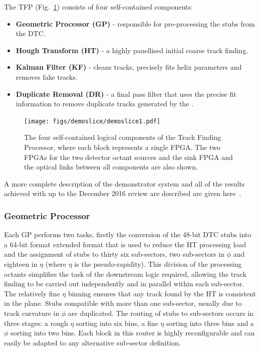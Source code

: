 The TFP (Fig.~\ref{fig:TFP}) consists of four self-contained components:
\begin{itemize}
\item {\bf Geometric Processor (GP)} - responsible for pre-processing the stubs from the DTC.
\item {\bf Hough Transform (HT)} - a highly panellised initial coarse track finding.
\item {\bf Kalman Filter (KF)} - cleans tracks, precisely fits helix parameters and removes fake tracks.
\item {\bf Duplicate Removal (DR)} - a final pass filter that uses the precise fit information to remove duplicate tracks generated by the \HT.
\end{itemize}

\begin{figure}[!h]
\centering
\texttt{[image: figs/demoslice/demoslice1.pdf]}
\caption{The four self-contained logical components of the Track Finding Processor, where each block represents a single FPGA. The two FPGAs for the two detector octant sources and the sink FPGA and the optical links between all components are also shown.}
\label{fig:TFP}
\end{figure}

A more complete description of the demonstrator system and all of the results achieved with up to the December 2016 review are described are given here~\cite{TMTT_JINST}.

\subsubsection{Geometric Processor}
Each GP performs two tasks, firstly the conversion of the 48-bit DTC stubs into a 64-bit format extended format that is used to reduce the HT processing load and the assignment of stubs to thirty six sub-sectors, two sub-sectors in $\phi$ and eighteen in $\eta$ (where $\eta$ is the pseudo-rapidity). 
This division of the processing octants simplifies the task of the downstream logic required, allowing the track finding to be carried out independently and in parallel within each sub-sector. 
The relatively fine $\eta$ binning ensures that any track found by the \rphi HT is consistent in the \rz plane. Stubs compatible with more than one sub-sector, usually due to track curvature in $\phi$ are duplicated. 
The routing of stubs to sub-sectors occurs in three stages: a rough $\eta$ sorting into six bins, a fine $\eta$ sorting into three bins and a $\phi$ sorting into two bins. 
Each block in this router is highly reconfigurable and can easily be adapted to any alternative sub-sector definition.

